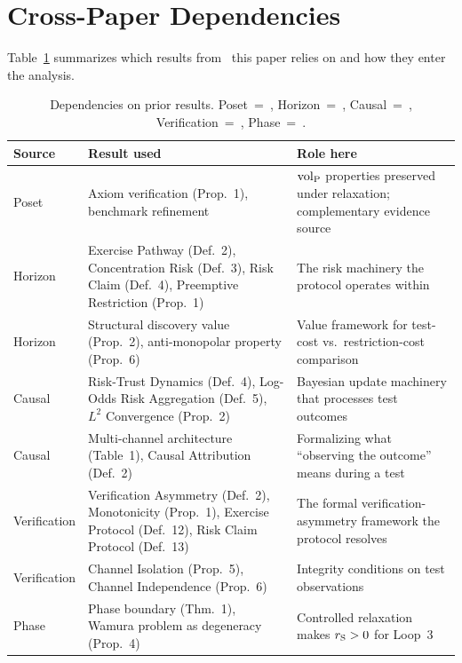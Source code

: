 \section{Cross-Paper Dependencies}
\label{app:dependencies}

Table~\ref{tab:dependencies7} summarizes which results
from~\citep{lasser2026gfm, lasser2026poset, lasser2026horizon,
lasser2026scm, lasser2026exo, lasser2026phase} this paper relies
on and how they enter the analysis.

\begin{table}[h]
\centering
\small
\begin{tabular}{@{}p{2.0cm}p{5.6cm}p{6.0cm}@{}}
\toprule
\textbf{Source} & \textbf{Result used} & \textbf{Role here} \\
\midrule
Poset        & Axiom verification (Prop.~1), benchmark refinement
             & ${\operatorname{vol}_{\mathrm{P}}}$ properties preserved under relaxation;
               complementary evidence source \\
Horizon      & Exercise Pathway (Def.~2), Concentration Risk (Def.~3),
               Risk Claim (Def.~4), Preemptive Restriction (Prop.~1)
             & The risk machinery the protocol operates within \\
Horizon      & Structural discovery value (Prop.~2), anti-monopolar
               property (Prop.~6)
             & Value framework for test-cost vs.\ restriction-cost
               comparison \\
Causal       & Risk-Trust Dynamics (Def.~4), Log-Odds Risk
               Aggregation (Def.~5), $L^2$ Convergence (Prop.~2)
             & Bayesian update machinery that processes test
               outcomes \\
Causal       & Multi-channel architecture (Table~1), Causal
               Attribution (Def.~2)
             & Formalizing what ``observing the outcome'' means
               during a test \\
Verification & Verification Asymmetry (Def.~2), Monotonicity
               (Prop.~1), Exercise Protocol (Def.~12), Risk Claim
               Protocol (Def.~13)
             & The formal verification-asymmetry framework the
               protocol resolves \\
Verification & Channel Isolation (Prop.~5), Channel Independence
               (Prop.~6)
             & Integrity conditions on test observations \\
Phase        & Phase boundary (Thm.~1), Wamura problem as
               degeneracy (Prop.~4)
             & Controlled relaxation makes $r_{\mathrm{S}} > 0$ for Loop~3 \\
\bottomrule
\end{tabular}
\caption{Dependencies on prior results.
  Poset~=~\citet{lasser2026poset},
  Horizon~=~\citet{lasser2026horizon},
  Causal~=~\citet{lasser2026scm},
  Verification~=~\citet{lasser2026exo},
  Phase~=~\citet{lasser2026phase}.}
\label{tab:dependencies7}
\end{table}
